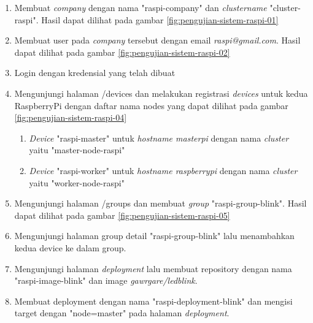 \begin{enumerate}
  \item Membuat \textit{company} dengan nama "raspi-company" dan \textit{cluster\textunderscore name} "cluster-raspi". Hasil dapat dilihat pada gambar \ref{fig:pengujian-sistem-raspi-01}
  \item Membuat user pada \textit{company} tersebut dengan email \textit{raspi@gmail.com}. Hasil dapat dilihat pada gambar \ref{fig:pengujian-sistem-raspi-02}
  \item Login dengan kredensial yang telah dibuat
  \item Mengunjungi halaman /devices dan melakukan registrasi \textit{devices} untuk kedua RaspberryPi dengan daftar nama nodes yang dapat dilihat pada gambar \ref{fig:pengujian-sistem-raspi-04}
        \begin{enumerate}
          \item \textit{Device} "raspi-master" untuk \textit{hostname masterpi} dengan nama \textit{cluster} yaitu "master-node-raspi"
          \item  \textit{Device} "raspi-worker" untuk \textit{hostname raspberrypi} dengan nama \textit{cluster} yaitu "worker-node-raspi"
        \end{enumerate}
  \item Mengunjungi halaman /groups dan membuat \textit{group} "raspi-group-blink". Hasil dapat dilihat pada gambar \ref{fig:pengujian-sistem-raspi-05}
  \item Mengunjungi halaman group detail "raspi-group-blink" lalu menambahkan kedua device ke dalam group.
  \item Mengunjungi halaman \textit{deployment} lalu membuat repository dengan nama "raspi-image-blink" dan image\textit{ gawrgare/led\textunderscore blink}.
  \item Membuat deployment dengan nama "raspi-deployment-blink" dan mengisi target dengan "node=master" pada halaman \textit{deployment}.
\end{enumerate}

